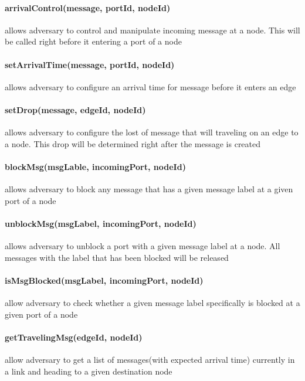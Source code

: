 \paragraph{arrivalControl(message, portId, nodeId)} allows adversary to control and manipulate incoming message at a node. This will be called right before it entering a port of a node

\paragraph{setArrivalTime(message, portId, nodeId)} allows adversary to configure an arrival time for message before it enters an edge

\paragraph{setDrop(message, edgeId, nodeId)} allows adversary to configure the lost of message that will traveling on an edge to a node. This drop will be determined right after the message is created

\paragraph{blockMsg(msgLable, incomingPort, nodeId)} allows adversary to block any message that has a given message label at a given port of a node

\paragraph{unblockMsg(msgLabel, incomingPort, nodeId)} allows adversary to unblock a port with a given message label at a node. All messages with the label that has been blocked will be released

\paragraph{isMsgBlocked(msgLabel, incomingPort, nodeId)} allow adversary to check whether a given message label specifically is blocked at a given port of a node

\paragraph{getTravelingMsg(edgeId, nodeId)} allow adversary to get a list of messages(with expected arrival time) currently in a link and heading to a given destination node


